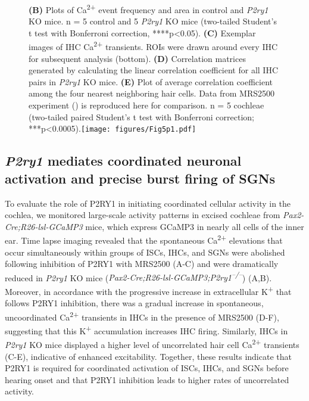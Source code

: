 \documentclass[9pt,lineno]{elife}
\begin{document}
\begin{figure}
\begin{fullwidth}
{\textbf{(B)} Plots of Ca\textsuperscript{2+} event frequency and area in control and \textit{P2ry1} KO mice. n = 5 control and 5 \textit{P2ry1} KO mice (two-tailed Student's t test with Bonferroni correction, ****p<0.05).
\textbf{(C)} Exemplar images of IHC Ca\textsuperscript{2+} transients. ROIs were drawn around every IHC for subsequent analysis (bottom). 
\textbf{(D)} Correlation matrices generated by calculating the linear correlation coefficient for all IHC pairs in \textit{P2ry1} KO mice.
\textbf{(E)} Plot of average correlation coefficient among the four nearest neighboring hair cells. Data from MRS2500 experiment () is reproduced here for comparison. n = 5 cochleae (two-tailed paired Student's t test with Bonferroni correction; ***p<0.0005).}{\texttt{[image: figures/Fig5p1.pdf]}}\label{figsupp:sf5p1}
\end{fullwidth}
\end{figure}

\subsection{\textit{P2ry1} mediates coordinated neuronal activation and precise burst firing of SGNs}
To evaluate the role of P2RY1 in initiating coordinated cellular activity in the cochlea, we monitored large-scale activity patterns in excised cochleae from \textit{Pax2-Cre;R26-lsl-GCaMP3} mice, which express GCaMP3 in nearly all cells of the inner ear. Time lapse imaging revealed that the spontaneous Ca\textsuperscript{2+} elevations that occur simultaneously within groups of ISCs, IHCs, and SGNs \citep{Tritsch2010,Zhang-Hooks2016} were abolished following inhibition of P2RY1 with MRS2500 (A-C) and were dramatically reduced in \textit{P2ry1} KO mice (\textit{Pax2-Cre;R26-lsl-GCaMP3;P2ry1\textsuperscript{–/–}}) (A,B). Moreover, in accordance with the progressive increase in extracellular K\textsuperscript{+} that follows P2RY1 inhibition, there was a gradual increase in spontaneous, uncoordinated Ca\textsuperscript{2+} transients in IHCs in the presence of MRS2500 (D-F), suggesting that this K\textsuperscript{+} accumulation increases IHC firing. Similarly, IHCs in \textit{P2ry1} KO mice displayed a higher level of uncorrelated hair cell Ca\textsuperscript{2+} transients (C-E), indicative of enhanced excitability. Together, these results indicate that P2RY1 is required for coordinated activation of ISCs, IHCs, and SGNs before hearing onset and that P2RY1 inhibition leads to higher rates of uncorrelated activity.
\end{document}
